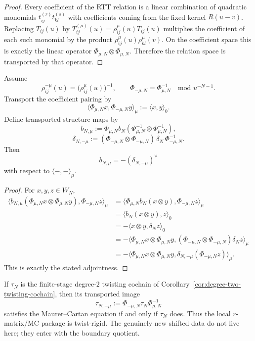\begin{proof}
Every coefficient of the RTT relation is a linear combination of quadratic
monomials $t_{ij}^{(r)}t_{kl}^{(s)}$ with coefficients coming from the fixed
kernel $R(u-v)$.  Replacing $T_{ij}(u)$ by
$T_{ij}^{(\mu)}(u)=\rho_{ij}^\mu(u)T_{ij}(u)$ multiplies the coefficient of each
such monomial by the product $\rho_{ij}^\mu(u)\rho_{kl}^\mu(v)$.  On the
coefficient space this is exactly the linear operator
$\Phi_{\mu,N}\otimes \Phi_{\mu,N}$.  Therefore the relation space is transported
by that operator.
\end{proof}

\begin{theorem}
\label{thm:finite-stage-shifted-bar-adjointness}
Assume
\[
\rho_{ij}^{-\mu}(u)=\bigl(\rho_{ij}^{\mu}(u)\bigr)^{-1},
\qquad
\Phi_{-\mu,N}=\Phi_{\mu,N}^{-1}
\quad \text{mod }u^{-N-1}.
\]
Transport the coefficient pairing by
\[
\langle \Phi_{\mu,N}x,\Phi_{-\mu,N}y\rangle_\mu:=\langle x,y\rangle_0.
\]
Define transported structure maps by
\[
b_{N,\mu}
:=
\Phi_{\mu,N}b_N(\Phi_{\mu,N}^{-1}\otimes \Phi_{\mu,N}^{-1}),
\]
\[
\delta_{N,-\mu}
:=
(\Phi_{-\mu,N}\otimes \Phi_{-\mu,N})\,\delta_N\,\Phi_{-\mu,N}^{-1}.
\]
Then
\[
b_{N,\mu}=-(\delta_{N,-\mu})^\vee
\]
with respect to $\langle -, -\rangle_\mu$.
\end{theorem}

\begin{proof}
For $x,y,z\in W_N$,
\begin{align*}
\langle b_{N,\mu}(\Phi_{\mu,N}x\otimes \Phi_{\mu,N}y),\Phi_{-\mu,N}z\rangle_\mu
&=
\langle \Phi_{\mu,N}b_N(x\otimes y),\Phi_{-\mu,N}z\rangle_\mu \\
&=
\langle b_N(x\otimes y),z\rangle_0 \\
&=
-\langle x\otimes y,\delta_Nz\rangle_0 \\
&=
-\langle \Phi_{\mu,N}x\otimes \Phi_{\mu,N}y,
(\Phi_{-\mu,N}\otimes \Phi_{-\mu,N})\delta_Nz\rangle_\mu \\
&=
-\langle \Phi_{\mu,N}x\otimes \Phi_{\mu,N}y,
\delta_{N,-\mu}(\Phi_{-\mu,N}z)\rangle_\mu.
\end{align*}
This is exactly the stated adjointness.
\end{proof}

\begin{remark}
\label{rem:twist-rigidity-local-mc}
If $\tau_N$ is the finite-stage degree-$2$ twisting cochain of
Corollary~\ref{cor:degree-two-twisting-cochain}, then its transported image
\[
\tau_{N,-\mu}:=\Phi_{-\mu,N}\tau_N\Phi_{\mu,N}^{-1}
\]
satisfies the Maurer--Cartan equation if and only if $\tau_N$ does.  Thus the
local $r$-matrix/MC package is twist-rigid.  The genuinely new shifted data do
not live here; they enter with the boundary quotient.
\end{remark}


